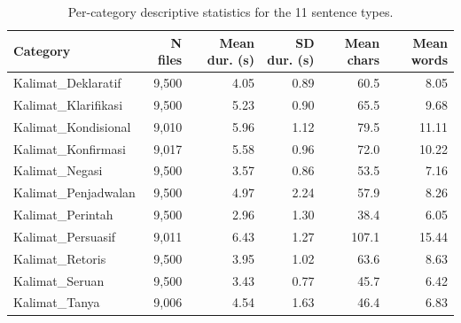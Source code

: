 \begin{table}[!t]
  \centering
  \caption{Per-category descriptive statistics for the 11 sentence types.}
  \label{tab:per_category}
  \small
  \begin{tabular}{lrrrrr}
  \toprule
  Category & N files & Mean dur. (s) & SD dur. (s) & Mean chars & Mean words \\
  \midrule
  Kalimat\_Deklaratif & 9,500 & 4.05 & 0.89 & 60.5 & 8.05 \\
  Kalimat\_Klarifikasi & 9,500 & 5.23 & 0.90 & 65.5 & 9.68 \\
  Kalimat\_Kondisional & 9,010 & 5.96 & 1.12 & 79.5 & 11.11 \\
  Kalimat\_Konfirmasi & 9,017 & 5.58 & 0.96 & 72.0 & 10.22 \\
  Kalimat\_Negasi & 9,500 & 3.57 & 0.86 & 53.5 & 7.16 \\
  Kalimat\_Penjadwalan & 9,500 & 4.97 & 2.24 & 57.9 & 8.26 \\
  Kalimat\_Perintah & 9,500 & 2.96 & 1.30 & 38.4 & 6.05 \\
  Kalimat\_Persuasif & 9,011 & 6.43 & 1.27 & 107.1 & 15.44 \\
  Kalimat\_Retoris & 9,500 & 3.95 & 1.02 & 63.6 & 8.63 \\
  Kalimat\_Seruan & 9,500 & 3.43 & 0.77 & 45.7 & 6.42 \\
  Kalimat\_Tanya & 9,006 & 4.54 & 1.63 & 46.4 & 6.83 \\
  \bottomrule
  \end{tabular}
\end{table}
